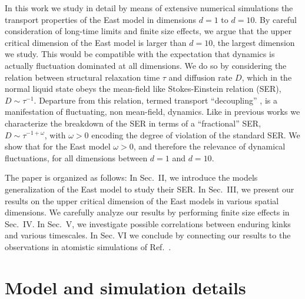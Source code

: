 \documentclass[showpacs,pre,aps,twocolumn,superscriptaddress]{revtex4-1}
\begin{document}
In this work we study in detail by means of extensive numerical simulations the transport properties of the East model in dimensions $d=1$ to $d=10$.  By careful 
consideration of long-time limits and finite size effects, we argue that the upper critical dimension of the East model is larger than $d=10$, the largest dimension we study.  This would be compatible with the expectation that dynamics is actually fluctuation dominated at all dimensions.  We do so by considering the relation between structural relaxation time $\tau$ and diffusion rate $D$, which in the normal liquid state obeys the mean-field like Stokes-Einstein relation (SER), $D \sim{\tau}^{-1}$.  Departure from this relation, termed transport ``decoupling'' \cite{Ediger2000}, is a manifestation of fluctuating, non mean-field, dynamics.  
Like in previous works \cite{Swallen2003,Jung2004,Schweizer2007,Swallen2009} we characterize the breakdown of the SER in terms of a ``fractional'' SER, $D\sim{\tau}^{-1+\omega}$, with $\omega>0$ encoding the degree of violation of the standard SER.  We show that for the East model $\omega > 0$, and therefore the relevance of dynamical fluctuations, for all dimensions between $d=1$ and $d=10$. 

The paper is organized as follows: In Sec.~II, we introduce the models generalization of the East model to study their SER. 
In Sec.~III, we present our results on the upper critical dimension of the East models in various spatial dimensions. 
We carefully analyze our results by performing finite size effects in Sec.~IV. 
In Sec.~V, we investigate possible correlations between enduring kinks and various timescales. 
In Sec. VI we conclude by connecting our results to the observations in atomistic simulations of Ref.~\cite{Charbonneau2012-2}.



\section{Model and simulation details}
\end{document}
